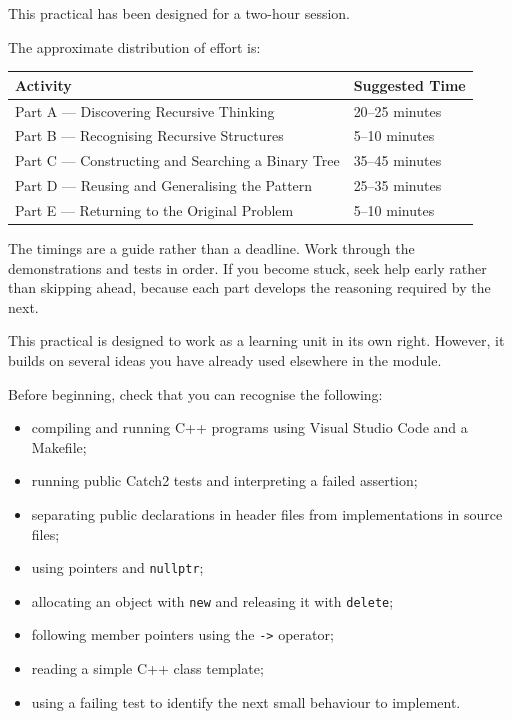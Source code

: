\documentclass{csc2059practical}
\begin{document}
\begin{infobox}

This practical has been designed for a two-hour session.

The approximate distribution of effort is:

\begin{center}
\begin{tabular}{ll}
\toprule
\textbf{Activity} & \textbf{Suggested Time} \\
\midrule
Part A --- Discovering Recursive Thinking & 20--25 minutes \\
Part B --- Recognising Recursive Structures & 5--10 minutes \\
Part C --- Constructing and Searching a Binary Tree & 35--45 minutes \\
Part D --- Reusing and Generalising the Pattern & 25--35 minutes \\
Part E --- Returning to the Original Problem & 5--10 minutes \\
\bottomrule
\end{tabular}
\end{center}
\end{infobox}

The timings are a guide rather than a deadline. Work through the demonstrations
and tests in order. If you become stuck, seek help early rather than skipping
ahead, because each part develops the reasoning required by the next.




This practical is designed to work as a learning unit in its own right.
However, it builds on several ideas you have already used elsewhere in the
module.

Before beginning, check that you can recognise the following:

\begin{itemize}
    \item compiling and running C++ programs using Visual Studio Code and a
          Makefile;
    \item running public Catch2 tests and interpreting a failed assertion;
    \item separating public declarations in header files from implementations
          in source files;
    \item using pointers and \texttt{nullptr};
    \item allocating an object with \texttt{new} and releasing it with
          \texttt{delete};
    \item following member pointers using the
          \texttt{->} operator;
    \item reading a simple C++ class template;
    \item using a failing test to identify the next small behaviour to
          implement.
\end{itemize}
\end{document}
